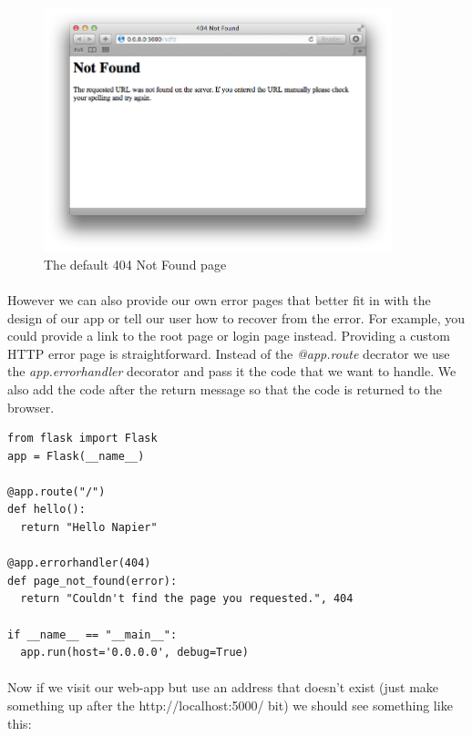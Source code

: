 \documentclass[12pt, a4paper, twoside]{book}
\begin{document}
\begin{figure}[H]
\centering
\includegraphics[width=0.9\textwidth]{images/flask-not-found.png}
\caption{The default 404 Not Found page}
\label{fig:flask-not-found}
\end{figure}

\paragraph{} However we can also provide our own error pages that better fit in with the design of our app or tell our user how to recover from the error. For example, you could provide a link to the root page or login page instead. Providing a custom HTTP error page is straightforward. Instead of the \emph{@app.route} decrator we use the \emph{app.errorhandler} decorator and pass it the code that we want to handle. We also add the code after the return message so that the code is returned to the browser.

\begin{lstlisting}
from flask import Flask
app = Flask(__name__)

@app.route("/")
def hello():
  return "Hello Napier"

@app.errorhandler(404)
def page_not_found(error):
  return "Couldn't find the page you requested.", 404

if __name__ == "__main__":
  app.run(host='0.0.0.0', debug=True)
\end{lstlisting}

\paragraph{} Now if we visit our web-app but use an address that doesn't exist (just make something up after the http://localhost:5000/ bit) we should see something like this:
\end{document}
